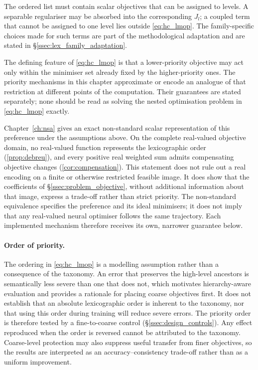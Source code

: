 The ordered list must contain scalar objectives that can be assigned to levels.
A separable regulariser may be absorbed into the corresponding $J_l$; a coupled
term that cannot be assigned to one level lies outside
\eqref{eq:hc_lmop}. The family-specific choices made for such terms are part of
the methodological adaptation and are stated in
\S\ref{ssec:lex_family_adaptation}.

The defining feature of \eqref{eq:hc_lmop} is that a lower-priority objective may
act only within the minimiser set already fixed by the higher-priority ones. The
priority mechanisms in this chapter approximate or encode an analogue of that
restriction at different points of the computation. Their guarantees are stated
separately; none should be read as solving the nested optimisation problem in
\eqref{eq:hc_lmop} exactly.

Chapter~\ref{ch:nsa} gives an exact non-standard scalar representation of this
preference under the assumptions above. On the complete real-valued objective
domain, no real-valued function represents the lexicographic order
(\cref{prop:debreu}), and every positive real weighted sum admits compensating
objective changes (\cref{cor:compensation}). This statement does not rule out a
real encoding on a finite or otherwise restricted feasible image. It does show
that the coefficients of \S\ref{ssec:problem_objective}, without additional
information about that image, express a trade-off rather than strict priority.
The non-standard equivalence specifies the preference and its ideal minimisers;
it does not imply that any real-valued neural optimiser follows the same
trajectory. Each implemented mechanism therefore receives its own, narrower
guarantee below.

\paragraph{Order of priority.} The ordering in \eqref{eq:hc_lmop} is a modelling
assumption rather than a consequence of the taxonomy. An error that preserves
the high-level ancestors is semantically less severe than one that does not,
which motivates hierarchy-aware evaluation and provides a rationale for placing
coarse objectives first. It does not establish that an absolute lexicographic
order is inherent to the taxonomy, nor that using this order during training
will reduce severe errors. The priority order is therefore tested by a
fine-to-coarse control (\S\ref{ssec:design_controls}). Any effect reproduced when
the order is reversed cannot be attributed to the taxonomy. Coarse-level
protection may also suppress useful transfer from finer objectives, so the
results are interpreted as an accuracy--consistency trade-off rather than as a
uniform improvement.

